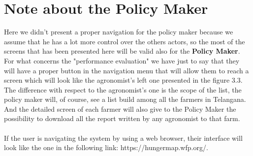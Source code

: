 \documentclass[10pt]{report}
\begin{document}
\section{Note about the Policy Maker}
Here we didn't present a proper navigation for the policy maker because we assume that he has a lot more control over the others actors, so the most of the screens that has been presented here will be valid also for the \textbf{Policy Maker}. \\
For what concerns the "performance evaluation" we have just to say that they will have a proper button in the navigation menu that will allow them to reach a screen which will look like the agronomist's left one presented in the figure 3.3. The difference with respect to the agronomist's one is the scope of the list, the policy maker will, of course, see a list build among all the farmers in Telangana. And the detailed screen of each farmer will also give to the Policy Maker the possibility to download all the report written by any agronomist to that farm.\\ \\

If the user is navigating the system by using a web browser, their interface will look like the one in the following link: https://hungermap.wfp.org/.
\end{document}
